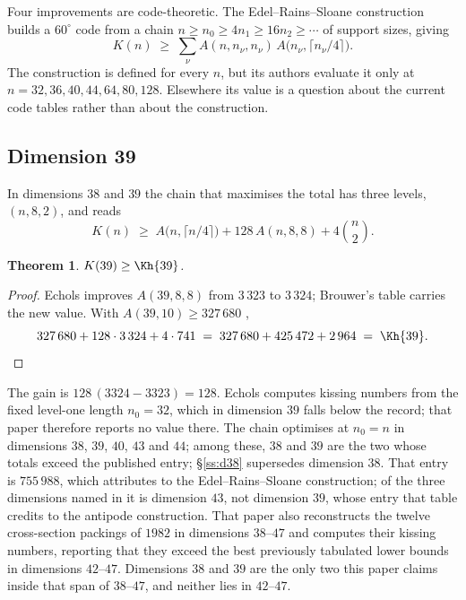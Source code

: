 \documentclass[11pt]{amsart}
\newtheorem{theorem}{Theorem}[section]
\theoremstyle{remark}
\begin{document}
Four improvements are code-theoretic. The Edel--Rains--Sloane construction
\cite{edel-rains-sloane1998} builds a $60^\circ$ code from a
chain $n\ge n_0\ge4n_1\ge16n_2\ge\cdots$ of support sizes, giving
\[
  K(n)\;\ge\;\sum_\nu A(n,n_\nu,n_\nu)\,A\bigl(n_\nu,\lceil n_\nu/4\rceil\bigr).
\]
The construction is defined for every $n$, but its authors evaluate it only at
$n=32,36,40,44,64,80,128$. Elsewhere its value is a question about the current
code tables rather than about the construction.

\subsection{Dimension 39}\label{ss:d39}

In dimensions $38$ and $39$ the chain that maximises the total has three
levels, $(n,8,2)$, and reads
\[
  K(n)\;\ge\;A\bigl(n,\lceil n/4\rceil\bigr)+128\,A(n,8,8)+4\binom{n}{2}.
\]

\begin{theorem}\label{thm:39}
$K(39)\ge\Kh{39}$.
\end{theorem}

\begin{proof}
Echols \cite{echols2026} improves $A(39,8,8)$ from $3\,323$ to $3\,324$;
Brouwer's table \cite{brouwer} carries the new value. With
$A(39,10)\ge327\,680$ \cite{zinoviev-litsyn1984},
\[
  327\,680+128\cdot3\,324+4\cdot741 \;=\; 327\,680+425\,472+2\,964 \;=\; \Kh{39} . \qedhere
\]
\end{proof}

The gain is $128\,(3324-3323)=128$. Echols \cite{echols2026} computes kissing
numbers from the fixed level-one length $n_0=32$, which in dimension $39$ falls
below the record; that paper therefore reports no value there. The chain
optimises at $n_0=n$ in dimensions $38$, $39$, $40$, $43$ and $44$; among these, $38$ and $39$
are the two whose totals exceed the published entry; \S\ref{ss:d38} supersedes
dimension $38$. That entry is $755\,988$, which
\cite{cohn-table} attributes to the Edel--Rains--Sloane construction; of the three
dimensions named in \cite{sun-wang2026} it is dimension $43$, not dimension $39$, whose
entry that table credits to the antipode construction. That paper also reconstructs the
twelve cross-section packings of $1982$ in dimensions $38$--$47$ and computes their
kissing numbers, reporting that they exceed the best previously tabulated lower bounds
in dimensions $42$--$47$. Dimensions $38$ and $39$ are the only two this paper claims
inside that span of $38$--$47$, and neither lies in $42$--$47$.
\end{document}
